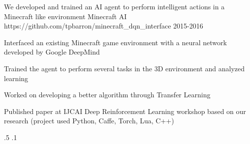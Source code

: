 \begin{cventries}

\vspace{-2.25em}
\myProject
{We developed and trained an AI agent to perform intelligent actions in a Minecraft like environment} %
{Minecraft AI} %
{https://github.com/tpbarron/minecraft\_dqn\_interface} %
{2015-2016} %
{ %
\begin{cvitems}
\item {Interfaced an existing Minecraft game environment with a neural network developed by Google DeepMind}
\item {Trained the agent to perform several tasks in the 3D environment and analyzed learning}
\item {Worked on developing a better algorithm through Transfer Learning}
\item {Published paper at IJCAI Deep Reinforcement Learning workshop based on our research (project used Python, Caffe, Torch, Lua, C++)}
\end{cvitems}
}
{.5}
{.1}





\end{cventries}
